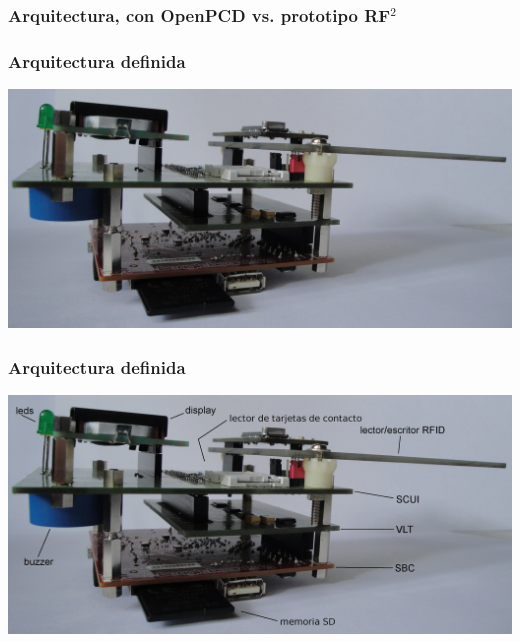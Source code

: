 \documentclass{beamer}
\begin{document}
\begin{frame}
	\frametitle{Arquitectura, con OpenPCD vs. prototipo RF$^{2}$}
	\begin{center}
	\end{center}
\end{frame}

\begin{frame}
	\frametitle{Arquitectura definida}
	\begin{center}
		\includegraphics[scale=.12]{Imagenes/prototipo_s.jpg}
	\end{center}
\end{frame}


\begin{frame}
	\frametitle{Arquitectura definida}
	\begin{center}
		\includegraphics[scale=.12]{Imagenes/prototipo_s_nombres.jpg}
	\end{center}
\end{frame}
\end{document}
